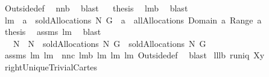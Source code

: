 \begin{isabellebody}
\ Outside{\isacharunderscore}def\ \isamarkupfalse%
\ nn{}{}b\ \isamarkupfalse%
\ blast\isanewline
{}\isamarkupfalse%
\ \isamarkupfalse%
\ {\isacharquery}thesis\ \isamarkupfalse%
\ lm{}{}b\ \isamarkupfalse%
\ blast\isanewline
{}\isamarkupfalse%
%
\endisatagproof
{\isafoldproof}%
%
\isadelimproof
\isanewline
%
\endisadelimproof
{}\isamarkupfalse%
\ lm{}{}{\isacharcolon}\ \ {\isachardoublequoteopen}a\ {\isasymin}\ soldAllocations\ N\ G{\isachardoublequoteclose}\ \ {\isachardoublequoteopen}a\ {\isasymin}\ allAllocations{\isacharprime}{\isacharprime}\ {\isacharparenleft}Domain\ a{\isacharparenright}\ {\isacharparenleft}{\isasymUnion}Range\ a{\isacharparenright}{\isachardoublequoteclose}\isanewline
%
\isadelimproof
%
\endisadelimproof
%
\isatagproof
{}\isamarkupfalse%
\ {\isacharminus}\ \isamarkupfalse%
\ {\isacharquery}thesis\ \isamarkupfalse%
\ assms\ lm{}{}\ \isamarkupfalse%
\ blast\ \isamarkupfalse%
%
\endisatagproof
{\isafoldproof}%
%
\isadelimproof
\isanewline
%
\endisadelimproof
{}\isamarkupfalse%
\ \ \ {\isachardoublequoteopen}N{}\ {\isasymsubseteq}\ N{}{\isachardoublequoteclose}\ \ {\isachardoublequoteopen}soldAllocations{\isacharprime}{\isacharprime}\ N{}\ G\ {\isasymsubseteq}\ soldAllocations{\isacharprime}{\isacharprime}\ N{}\ G{\isachardoublequoteclose}\isanewline
%
\isadelimproof
%
\endisadelimproof
%
\isatagproof
{}\isamarkupfalse%
\ assms\ lm{}{}\ lm{}{}\ \ nn{}{}c\ lm{}{}b\ lm{}{}\ lm{}{}\ lm{}{}\ Outside{\isacharunderscore}def\ \isamarkupfalse%
\ blast%
\endisatagproof
{\isafoldproof}%
%
\isadelimproof
\isanewline
%
\endisadelimproof
\isanewline
{}\isamarkupfalse%
\ lll{}{}b{\isacharcolon}\ {\isachardoublequoteopen}runiq\ {\isacharparenleft}X{\isasymtimes}{\isacharbraceleft}y{\isacharbraceright}{\isacharparenright}{\isachardoublequoteclose}%
\isadelimproof
\ %
\endisadelimproof
%
\isatagproof
{}\isamarkupfalse%
\ rightUniqueTrivialCartes\ \isamarkupfalse%

\end{isabellebody}
